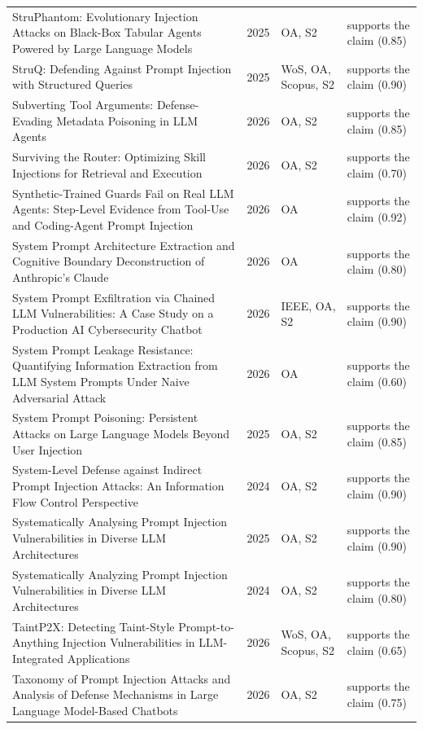 \begin{longtable}{@{}%
  >{\raggedright\arraybackslash}p{}c%
  >{\raggedright\arraybackslash}p{}%
  >{\raggedright\arraybackslash}p{}@{}}
StruPhantom: Evolutionary Injection Attacks on Black-Box Tabular Agents Powered by Large Language Models & 2025 & OA, S2 & supports the claim (0.85) \\
StruQ: Defending Against Prompt Injection with Structured Queries & 2025 & WoS, OA, Scopus, S2 & supports the claim (0.90) \\
Subverting Tool Arguments: Defense-Evading Metadata Poisoning in LLM Agents & 2026 & OA, S2 & supports the claim (0.85) \\
Surviving the Router: Optimizing Skill Injections for Retrieval and Execution & 2026 & OA, S2 & supports the claim (0.70) \\
Synthetic-Trained Guards Fail on Real LLM Agents: Step-Level Evidence from Tool-Use and Coding-Agent Prompt Injection & 2026 & OA & supports the claim (0.92) \\
System Prompt Architecture Extraction and Cognitive Boundary Deconstruction of Anthropic's Claude & 2026 & OA & supports the claim (0.80) \\
System Prompt Exfiltration via Chained LLM Vulnerabilities: A Case Study on a Production AI Cybersecurity Chatbot & 2026 & IEEE, OA, S2 & supports the claim (0.90) \\
System Prompt Leakage Resistance: Quantifying Information Extraction from LLM System Prompts Under Naive Adversarial Attack & 2026 & OA & supports the claim (0.60) \\
System Prompt Poisoning: Persistent Attacks on Large Language Models Beyond User Injection & 2025 & OA, S2 & supports the claim (0.85) \\
System-Level Defense against Indirect Prompt Injection Attacks: An Information Flow Control Perspective & 2024 & OA, S2 & supports the claim (0.90) \\
Systematically Analysing Prompt Injection Vulnerabilities in Diverse LLM Architectures & 2025 & OA, S2 & supports the claim (0.90) \\
Systematically Analyzing Prompt Injection Vulnerabilities in Diverse LLM Architectures & 2024 & OA, S2 & supports the claim (0.80) \\
TaintP2X: Detecting Taint-Style Prompt-to-Anything Injection Vulnerabilities in LLM-Integrated Applications & 2026 & WoS, OA, Scopus, S2 & supports the claim (0.65) \\
Taxonomy of Prompt Injection Attacks and Analysis of Defense Mechanisms in Large Language Model-Based Chatbots & 2026 & OA, S2 & supports the claim (0.75) \\

\end{longtable}
